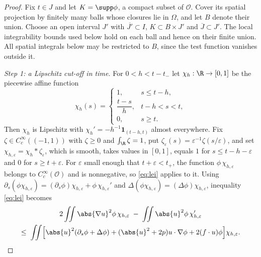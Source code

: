 \documentclass[11pt,reqno]{amsart}
\begin{document}
\begin{proof}
Fix $t\in J$ and let $K=\supp\phi$, a compact subset of $\mathcal{O}$.
Cover its spatial projection by finitely many balls whose closures lie in
$\Omega$, and let $B$ denote their union. Choose an open interval $J'$
with $\overline{J'}\subset I$, $K\subset B\times J'$ and
$\overline{J}\subset J'$. The local integrability bounds used below hold
on each ball and hence on their finite union. All spatial integrals below
may be restricted to $B$, since the test function vanishes outside it.

\emph{Step 1: a Lipschitz cut-off in time.} For $0<h<t-t_{-}$ let
$\chi_{h}:\R\to[0,1]$ be the piecewise affine function
\begin{equation}\label{eq:time-cutoff}
  \chi_{h}(s)=\begin{cases}
    1,& s\le t-h,\\[2pt]
    \dfrac{t-s}{h},& t-h<s<t,\\[6pt]
    0,& s\ge t .
  \end{cases}
\end{equation}
Then $\chi_{h}$ is Lipschitz with
$\chi_{h}'=-h^{-1}\mathbf{1}_{(t-h,t)}$ almost everywhere. Fix
$\zeta\in C_{c}^{\infty}((-1,1))$ with $\zeta\ge0$ and $\int_{\R}\zeta=1$, put
$\zeta_{\varepsilon}(s)=\varepsilon^{-1}\zeta(s/\varepsilon)$, and set
$\chi_{h,\varepsilon}=\chi_{h}*\zeta_{\varepsilon}$, which is smooth, takes
values in $[0,1]$, equals $1$ for $s\le t-h-\varepsilon$ and $0$ for
$s\ge t+\varepsilon$. For $\varepsilon$ small enough that
$t+\varepsilon<t_{+}$, the function
$\phi\,\chi_{h,\varepsilon}$ belongs to $C_{c}^{\infty}(\mathcal{O})$ and is
nonnegative, so \eqref{eq:lei} applies to it. Using
$\partial_{s}(\phi\chi_{h,\varepsilon})
 =(\partial_{s}\phi)\chi_{h,\varepsilon}+\phi\,\chi_{h,\varepsilon}'$
and $\Delta(\phi\chi_{h,\varepsilon})=(\Delta\phi)\chi_{h,\varepsilon}$,
inequality \eqref{eq:lei} becomes
\begin{multline}\label{eq:lei-cut}
  2\iint\abs{\nabla u}^{2}\phi\,\chi_{h,\varepsilon}
  \;-\;\iint\abs{u}^{2}\phi\,\chi_{h,\varepsilon}'\\
  \le\;\iint\Bigl[\abs{u}^{2}(\partial_{s}\phi+\Delta\phi)
    +(\abs{u}^{2}+2p)u\cdot\nabla\phi+2(f\cdot u)\phi\Bigr]\chi_{h,\varepsilon}.
\end{multline}


\end{proof}
\end{document}
